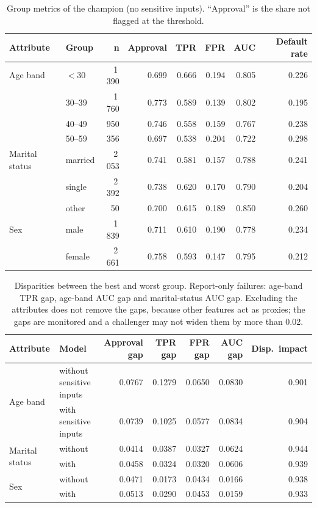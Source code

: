 \documentclass[11pt,a4paper]{article}
\newcommand{\hdr}[1]{\textbf{\color{navy}#1}}
\begin{document}
\begin{table}[htbp]
\centering\small
\begin{tabularx}{\linewidth}{llrrrrrr}
\toprule
\hdr{Attribute} & \hdr{Group} & \hdr{n} & \hdr{Approval} & \hdr{TPR} & \hdr{FPR} & \hdr{AUC} & \hdr{Default rate}\\
\midrule
Age band & $<$30 & 1\,390 & 0.699 & 0.666 & 0.194 & 0.805 & 0.226\\
 & 30--39 & 1\,760 & 0.773 & 0.589 & 0.139 & 0.802 & 0.195\\
 & 40--49 & 950 & 0.746 & 0.558 & 0.159 & 0.767 & 0.238\\
 & 50--59 & 356 & 0.697 & 0.538 & 0.204 & 0.722 & 0.298\\
\midrule
Marital status & married & 2\,053 & 0.741 & 0.581 & 0.157 & 0.788 & 0.241\\
 & single & 2\,392 & 0.738 & 0.620 & 0.170 & 0.790 & 0.204\\
 & other & 50 & 0.700 & 0.615 & 0.189 & 0.850 & 0.260\\
\midrule
Sex & male & 1\,839 & 0.711 & 0.610 & 0.190 & 0.778 & 0.234\\
 & female & 2\,661 & 0.758 & 0.593 & 0.147 & 0.795 & 0.212\\
\bottomrule
\end{tabularx}
\caption{Group metrics of the champion (no sensitive inputs). ``Approval'' is the share not flagged at the threshold.}
\end{table}

\begin{table}[htbp]
\centering\small
\begin{tabularx}{\linewidth}{lXrrrrr}
\toprule
\hdr{Attribute} & \hdr{Model} & \hdr{Approval gap} & \hdr{TPR gap} & \hdr{FPR gap} & \hdr{AUC gap} & \hdr{Disp.\ impact}\\
\midrule
\multirow{2}{*}{Age band} & without sensitive inputs & 0.0767 & 0.1279 & 0.0650 & 0.0830 & 0.901\\
 & with sensitive inputs & 0.0739 & 0.1025 & 0.0577 & 0.0834 & 0.904\\
\multirow{2}{*}{Marital status} & without & 0.0414 & 0.0387 & 0.0327 & 0.0624 & 0.944\\
 & with & 0.0458 & 0.0324 & 0.0320 & 0.0606 & 0.939\\
\multirow{2}{*}{Sex} & without & 0.0471 & 0.0173 & 0.0434 & 0.0166 & 0.938\\
 & with & 0.0513 & 0.0290 & 0.0453 & 0.0159 & 0.933\\
\bottomrule
\end{tabularx}
\caption{Disparities between the best and worst group. Report-only failures: age-band TPR gap, age-band AUC gap and marital-status AUC gap. Excluding the attributes does not remove the gaps, because other features act as proxies; the gaps are monitored and a challenger may not widen them by more than 0.02.}
\end{table}
\end{document}
